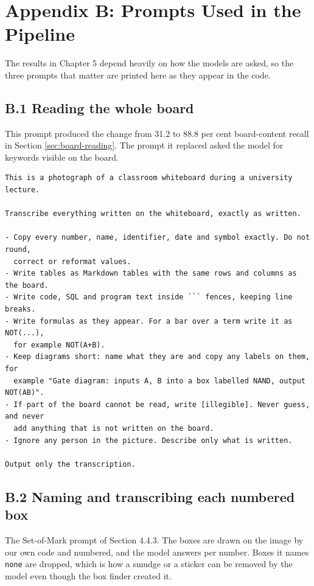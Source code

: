 \chapter*{Appendix B: Prompts Used in the Pipeline}

The results in Chapter 5 depend heavily on how the models are asked, so the three prompts
that matter are printed here as they appear in the code.

\section*{B.1 Reading the whole board}

This prompt produced the change from 31.2 to 88.8 per cent board-content recall in Section
\ref{sec:board-reading}. The prompt it replaced asked the model for keywords visible on
the board.

\begingroup\footnotesize
\begin{verbatim}
This is a photograph of a classroom whiteboard during a university lecture.

Transcribe everything written on the whiteboard, exactly as written.

- Copy every number, name, identifier, date and symbol exactly. Do not round,
  correct or reformat values.
- Write tables as Markdown tables with the same rows and columns as the board.
- Write code, SQL and program text inside ``` fences, keeping line breaks.
- Write formulas as they appear. For a bar over a term write it as NOT(...),
  for example NOT(A+B).
- Keep diagrams short: name what they are and copy any labels on them, for
  example "Gate diagram: inputs A, B into a box labelled NAND, output NOT(AB)".
- If part of the board cannot be read, write [illegible]. Never guess, and never
  add anything that is not written on the board.
- Ignore any person in the picture. Describe only what is written.

Output only the transcription.
\end{verbatim}
\endgroup

\section*{B.2 Naming and transcribing each numbered box}

The Set-of-Mark prompt of Section 4.4.3. The boxes are drawn on the image by our own code
and numbered, and the model answers per number. Boxes it names \texttt{none} are dropped,
which is how a smudge or a sticker can be removed by the model even though the box finder
created it.

